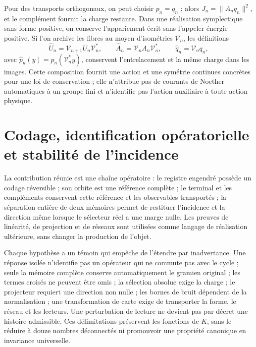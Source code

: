 Pour des transports orthogonaux, on peut choisir \(p_n=q_n\) ; alors
\(J_n=\|A_nq_n\|^2\), et le complément fournit la charge
restante. Dans une réalisation symplectique sans forme positive, on conserve
l’appariement écrit sans l’appeler énergie positive. Si l’on
archive les fibres au moyen d’isométries \(\mathcal V_n\), les
définitions
\[
 \widehat U_n=\mathcal V_{n+1}U_n\mathcal V_n^*,\qquad
 \widehat A_n=\mathcal V_nA_n\mathcal V_n^*,\qquad
 \widehat q_n=\mathcal V_nq_n,
\]
avec \(\widehat p_n(y)=p_n(\mathcal V_n^*y)\), conservent
l’entrelacement et la même charge dans les images. Cette composition
fournit une action et une symétrie continues concrètes pour une loi de
conservation ; elle n’attribue pas de courants de Noether automatiques à un groupe
fini et n’identifie pas l’action auxiliaire à toute action physique.

\section{Codage, identification opératorielle et stabilité de l'incidence}
\label{x_reciprocidad:lib01:alcance}

La contribution réunie est une chaîne opératoire : le registre engendré possède un codage réversible ; son orbite est une référence complète ; le terminal et les compléments conservent cette référence et les observables transportés ; la séparation entière de deux mémoires permet de restituer l'incidence et la direction même lorsque le sélecteur réel a une marge nulle. Les preuves de linéarité, de projection et de réseaux sont utilisées comme langage de réalisation ultérieure, sans changer la production de l'objet.

Chaque hypothèse a un témoin qui empêche de l’étendre par inadvertance.
Une réponse isolée n’identifie pas un opérateur qui ne commute pas avec le
cycle ; seule la mémoire complète conserve automatiquement le gramien original ;
les termes croisés ne peuvent être omis ; la sélection absolue exige
la charge ; le projecteur requiert une direction non nulle ; les bornes de bruit
dépendent de la normalisation ; une transformation de carte exige de transporter
la forme, le réseau et les lecteurs. Une perturbation de lecture ne devient pas par
décret une histoire admissible. Ces délimitations préservent les
fonctions de \(K\), sans le réduire à douze nombres déconnectés ni
promouvoir une propriété canonique en invariance universelle.
